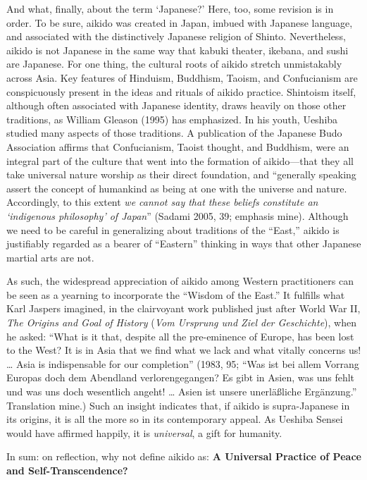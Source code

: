 And what, finally, about the term `Japanese?' Here, too, some revision is in order. To be sure, aikido was created in Japan, imbued with Japanese language, and associated with the distinctively Japanese religion of Shinto. Nevertheless, aikido is not Japanese in the same way that kabuki theater, ikebana, and sushi are Japanese. For one thing, the cultural roots of aikido stretch unmistakably across Asia. Key features of Hinduism, Buddhism, Taoism, and Confucianism are conspicuously present in the ideas and rituals of aikido practice. Shintoism itself, although often associated with Japanese identity, draws heavily on those other traditions, as William Gleason (1995) has emphasized. In his youth, Ueshiba studied many aspects of those traditions. A publication of the Japanese Budo Association affirms that Confucianism, Taoist thought, and Buddhism, were an integral part of the culture that went into the formation of aikido---that they all take universal nature worship as their direct foundation, and ``generally speaking assert the concept of humankind as being at one with the universe and nature. Accordingly, to this extent \emph{we cannot say that these beliefs constitute an `indigenous philosophy' of Japan}'' (Sadami 2005, 39; emphasis mine). Although we need to be careful in generalizing about traditions of the ``East,'' aikido is justifiably regarded as a bearer of ``Eastern'' thinking in ways that other Japanese martial arts are not. 

As such, the widespread appreciation of aikido among Western practitioners can be seen as a yearning to incorporate the ``Wisdom of the East.'' It fulfills what Karl Jaspers imagined, in the clairvoyant work published just after World War II, \emph{The Origins and Goal of History} (\emph{Vom Ursprung und Ziel der Geschichte}), when he asked: ``What is it that, despite all the pre-eminence of Europe, has been lost to the West? It is in Asia that we find what we lack and what vitally concerns us! \ldots{} Asia is indispensable for our completion'' (1983, 95; ``Was ist bei allem Vorrang Europas doch dem Abendland verlorengegangen? Es gibt in Asien, was uns fehlt und was uns doch wesentlich angeht! \ldots{} Asien ist unsere unerl\"{a}\ss{}liche Erg\"{a}nzung.'' Translation mine.) Such an insight indicates that, if aikido is supra-Japanese in its origins, it is all the more so in its contemporary appeal. As Ueshiba Sensei would have affirmed happily, it is \emph{universal}, a gift for humanity. 

In sum: on reflection, why not define aikido as: \textbf{A Universal Practice of Peace and Self-Transcendence?}

